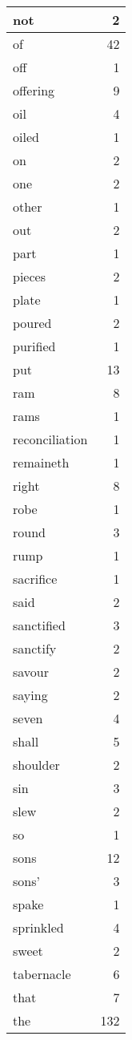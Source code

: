 \begin{center}
\begin{longtable}{l|r}
not & 2 \\ \hline
of & 42 \\ \hline
off & 1 \\ \hline
offering & 9 \\ \hline
oil & 4 \\ \hline
oiled & 1 \\ \hline
on & 2 \\ \hline
one & 2 \\ \hline
other & 1 \\ \hline
out & 2 \\ \hline
part & 1 \\ \hline
pieces & 2 \\ \hline
plate & 1 \\ \hline
poured & 2 \\ \hline
purified & 1 \\ \hline
put & 13 \\ \hline
ram & 8 \\ \hline
rams & 1 \\ \hline
reconciliation & 1 \\ \hline
remaineth & 1 \\ \hline
right & 8 \\ \hline
robe & 1 \\ \hline
round & 3 \\ \hline
rump & 1 \\ \hline
sacrifice & 1 \\ \hline
said & 2 \\ \hline
sanctified & 3 \\ \hline
sanctify & 2 \\ \hline
savour & 2 \\ \hline
saying & 2 \\ \hline
seven & 4 \\ \hline
shall & 5 \\ \hline
shoulder & 2 \\ \hline
sin & 3 \\ \hline
slew & 2 \\ \hline
so & 1 \\ \hline
sons & 12 \\ \hline
sons' & 3 \\ \hline
spake & 1 \\ \hline
sprinkled & 4 \\ \hline
sweet & 2 \\ \hline
tabernacle & 6 \\ \hline
that & 7 \\ \hline
the & 132 \\ \hline

\end{longtable}
\end{center}
